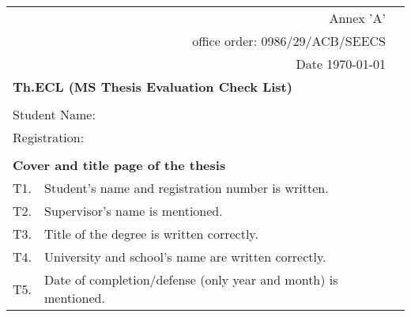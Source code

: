 \begin{table}[!ht]
\footnotesize
\begin{adjustbox}{width=\linewidth,center}
\begin{tabular}{p{0.6cm}p{9cm}p{0.6cm}}
               & \multicolumn{1}{r}{Annex 'A'}                                                                                   &  \\
               & \multicolumn{1}{r}{office order: 0986/29/ACB/SEECS}                                                             &  \\
               & \multicolumn{1}{r}{Date \today }                                                                &  \\
\multicolumn{2}{l}{\textbf{Th.ECL (MS Thesis   Evaluation Check List)}}                                                          &  \\
               &                                                                                                                 &  \\
\multicolumn{2}{l}{Student  Name:}                                                                                               &  \\
\multicolumn{2}{l}{Registration:}                                                                                                &  \\
               &                                                                                                                 &  \\
\multicolumn{2}{l}{\textbf{Cover and title   page of the thesis}}                                                                &  \\
T1.            & Student's name and registration   number is written.                                                            &  \\
T2.            & Supervisor's name is   mentioned.                                                                               &  \\
T3.            & Title of the degree   is written correctly.                                                                     &  \\
T4.            & University and   school's name are written correctly.                                                           &  \\
T5.            & Date of   completion/defense (only year and month) is mentioned.                                                &  \\

\end{tabular}
\end{adjustbox}
\end{table}
